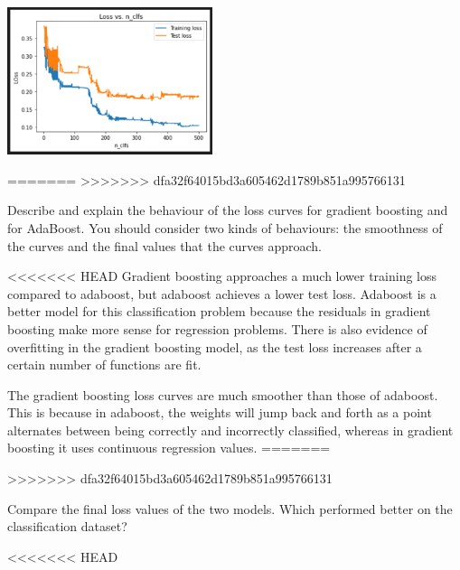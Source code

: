 \begin{solution}
\begin{center}
        \includegraphics[width=0.45\textwidth]{ada2.png}
    \end{center}
\end{solution}

=======
>>>>>>> dfa32f64015bd3a605462d1789b851a995766131
\begin{problem}[2]
    Describe and explain the behaviour of the loss curves for gradient boosting and for AdaBoost. You should consider two kinds of behaviours: the smoothness of the curves and the final values that the curves approach.
\end{problem}

\begin{solution}
<<<<<<< HEAD
  Gradient boosting approaches a much lower training loss compared to adaboost, but adaboost achieves a lower test loss. Adaboost is a better model for this classification problem because the residuals in gradient boosting make more sense for regression problems. There is also evidence of overfitting in the gradient boosting model, as the test loss increases after a certain number of functions are fit.
  
  The gradient boosting loss curves are much smoother than those of adaboost. This is because in adaboost, the weights will jump back and forth as a point alternates between being correctly and incorrectly classified, whereas in gradient boosting it uses continuous regression values.
=======
  
>>>>>>> dfa32f64015bd3a605462d1789b851a995766131
\end{solution}

\begin{problem}[2]
    Compare the final loss values of the two models. Which performed better on the classification dataset?
\end{problem}
<<<<<<< HEAD
    
